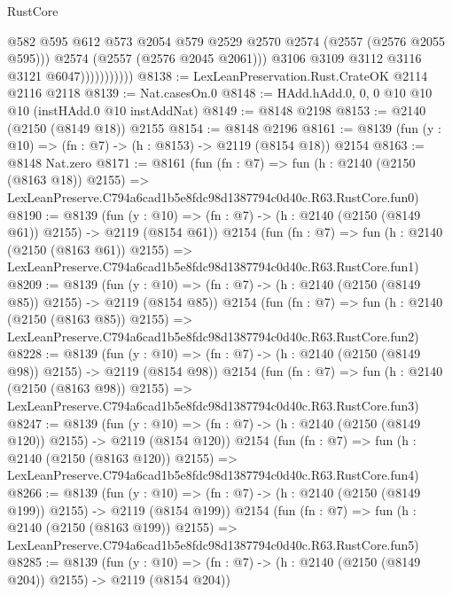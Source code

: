 \begin{lexlean}{RustCore}
\begin{coremodule}
                              @582
                              @595
                              @612
                              @573
                              @2054
                              @579
                              @2529
                              @2570
                              @2574
                              (@2557 (@2576 @2055 @595)))
                            @2574
                            (@2557 (@2576 @2045 @2061)))
                          @3106
                          @3109
                          @3112
                          @3116
                          @3121
                          @6047)))))))))))
@8138 := LexLeanPreservation.Rust.CrateOK @2114 @2116 @2118
@8139 := Nat.casesOn.{0}
@8148 := HAdd.hAdd.{0, 0, 0} @10 @10 @10 (instHAdd.{0} @10 instAddNat)
@8149 := @8148 @2198
@8153 := @2140 (@2150 (@8149 @18)) @2155
@8154 := @8148 @2196
@8161 := @8139 (fun (y : @10) => (fn : @7) -> (h : @8153) -> @2119 (@8154 @18)) @2154
@8163 := @8148 Nat.zero
@8171 := @8161
    (fun (fn : @7) =>
    fun (h : @2140 (@2150 (@8163 @18)) @2155) =>
    LexLeanPreserve.C794a6cad1b5e8fdc98d1387794c0d40c.R63.RustCore.fun0)
@8190 := @8139
    (fun (y : @10) => (fn : @7) -> (h : @2140 (@2150 (@8149 @61)) @2155) -> @2119 (@8154 @61))
    @2154
    (fun (fn : @7) =>
    fun (h : @2140 (@2150 (@8163 @61)) @2155) =>
    LexLeanPreserve.C794a6cad1b5e8fdc98d1387794c0d40c.R63.RustCore.fun1)
@8209 := @8139
    (fun (y : @10) => (fn : @7) -> (h : @2140 (@2150 (@8149 @85)) @2155) -> @2119 (@8154 @85))
    @2154
    (fun (fn : @7) =>
    fun (h : @2140 (@2150 (@8163 @85)) @2155) =>
    LexLeanPreserve.C794a6cad1b5e8fdc98d1387794c0d40c.R63.RustCore.fun2)
@8228 := @8139
    (fun (y : @10) => (fn : @7) -> (h : @2140 (@2150 (@8149 @98)) @2155) -> @2119 (@8154 @98))
    @2154
    (fun (fn : @7) =>
    fun (h : @2140 (@2150 (@8163 @98)) @2155) =>
    LexLeanPreserve.C794a6cad1b5e8fdc98d1387794c0d40c.R63.RustCore.fun3)
@8247 := @8139
    (fun (y : @10) => (fn : @7) -> (h : @2140 (@2150 (@8149 @120)) @2155) -> @2119 (@8154 @120))
    @2154
    (fun (fn : @7) =>
    fun (h : @2140 (@2150 (@8163 @120)) @2155) =>
    LexLeanPreserve.C794a6cad1b5e8fdc98d1387794c0d40c.R63.RustCore.fun4)
@8266 := @8139
    (fun (y : @10) => (fn : @7) -> (h : @2140 (@2150 (@8149 @199)) @2155) -> @2119 (@8154 @199))
    @2154
    (fun (fn : @7) =>
    fun (h : @2140 (@2150 (@8163 @199)) @2155) =>
    LexLeanPreserve.C794a6cad1b5e8fdc98d1387794c0d40c.R63.RustCore.fun5)
@8285 := @8139
    (fun (y : @10) => (fn : @7) -> (h : @2140 (@2150 (@8149 @204)) @2155) -> @2119 (@8154 @204))

\end{coremodule}
\end{lexlean}
